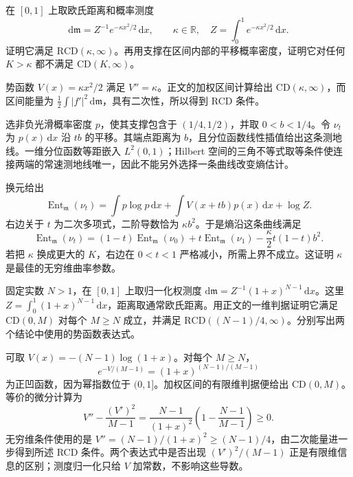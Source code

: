 \begin{exercise}\label{g3:ex:C-quadratic-potential-sharp}
	在 \([0,1]\) 上取欧氏距离和概率测度
	\[
		\mathrm d\mathfrak m=Z^{-1}e^{-\kappa x^2/2}\,\mathrm dx,
		\qquad\kappa\in\mathbb R,\quad Z=\int_0^1e^{-\kappa x^2/2}\,\mathrm dx.
	\]
	证明它满足 \(\mathrm{RCD}(\kappa,\infty)\)。再用支撑在区间内部的平移概率密度，证明它对任何 \(K>\kappa\) 都不满足 \(\mathrm{CD}(K,\infty)\)。
\end{exercise}
\begin{solution}
	势函数 \(V(x)=\kappa x^2/2\) 满足 \(V''=\kappa\)。正文的加权区间计算给出 \(\mathrm{CD}(\kappa,\infty)\)，而区间能量为 \(\tfrac12\int|f'|^2\,\mathrm d\mathfrak m\)，具有二次性，所以得到 RCD 条件。

	选非负光滑概率密度 \(p\)，使其支撑包含于 \((1/4,1/2)\)，并取 \(0<b<1/4\)。令 \(\nu_t\) 为 \(p(x)\,\mathrm dx\) 沿 \(tb\) 的平移。其端点距离为 \(b\)，且分位函数线性插值给出这条测地线。一维分位函数等距嵌入 \(L^2(0,1)\)；Hilbert 空间的三角不等式取等条件使连接两端的常速测地线唯一，因此不能另外选择一条曲线改变熵估计。

	换元给出
	\[
		\operatorname{Ent}_{\mathfrak m}(\nu_t)
		=\int p\log p\,\mathrm dx+\int V(x+tb)p(x)\,\mathrm dx+\log Z.
	\]
	右边关于 \(t\) 为二次多项式，二阶导数恰为 \(\kappa b^2\)。于是熵沿这条曲线满足
	\[
		\operatorname{Ent}_{\mathfrak m}(\nu_t)
		=(1-t)\operatorname{Ent}_{\mathfrak m}(\nu_0)
		+t\operatorname{Ent}_{\mathfrak m}(\nu_1)
		-\frac\kappa2t(1-t)b^2.
	\]
	若把 \(\kappa\) 换成更大的 \(K\)，右边在 \(0<t<1\) 严格减小，所需上界不成立。这证明 \(\kappa\) 是最佳的无穷维曲率参数。
\end{solution}

\begin{exercise}\label{g3:ex:C-power-density-dimension}
	固定实数 \(N>1\)，在 \([0,1]\) 上取归一化权测度 \(\mathrm d\mathfrak m=Z^{-1}(1+x)^{N-1}\,\mathrm dx\)。这里 \(Z=\int_0^1(1+x)^{N-1}\,\mathrm dx\)，距离取通常欧氏距离。用正文的一维判据证明它满足 \(\mathrm{CD}(0,M)\) 对每个 \(M\ge N\) 成立，并满足 \(\mathrm{RCD}((N-1)/4,\infty)\)。分别写出两个结论中使用的势函数表达式。
\end{exercise}
\begin{solution}
	可取 \(V(x)=-(N-1)\log(1+x)\)。对每个 \(M\ge N\)，
	\[
		e^{-V/(M-1)}=(1+x)^{(N-1)/(M-1)}
	\]
	为正凹函数，因为幂指数位于 \((0,1]\)。加权区间的有限维判据便给出 \(\mathrm{CD}(0,M)\)。等价的微分计算为
	\[
		V''-\frac{(V')^2}{M-1}
		=\frac{N-1}{(1+x)^2}\left(1-\frac{N-1}{M-1}\right)\ge0.
	\]
	无穷维条件使用的是 \(V''=(N-1)/(1+x)^2\ge(N-1)/4\)，由二次能量进一步得到所述 RCD 条件。两个表达式中是否出现 \((V')^2/(M-1)\) 正是有限维信息的区别；测度归一化只给 \(V\) 加常数，不影响这些导数。
\end{solution}

